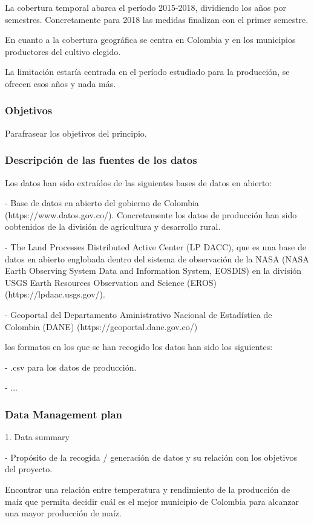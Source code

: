 \documentclass[12pt, spanish]{article}
\begin{document}
La cobertura temporal abarca el período 2015-2018, dividiendo los años por   semestres. Concretamente para 2018 las medidas finalizan con el primer semestre.

En cuanto a la cobertura geográfica se centra en Colombia y en los municipios productores del cultivo elegido.

La limitación estaría centrada en el período estudiado para la producción, se ofrecen esos años y nada más.

\subsubsection{Objetivos}

Parafrasear los objetivos del principio.

\subsubsection{Descripción de las fuentes de los datos}

Los datos han sido extraídos de las siguientes bases de datos en abierto: 

- Base de datos en abierto del gobierno de Colombia (https://www.datos.gov.co/). Concretamente los datos de producción han sido oobtenidos de la división de agricultura y desarrollo rural.

- The Land Processes Distributed Active Center (LP DACC), que es una base de datos en abierto englobada dentro del sistema de observación de la NASA (NASA Earth Observing System Data and Information System, EOSDIS) en la división USGS Earth Resources Observation and Science (EROS) (https://lpdaac.usgs.gov/).

- Geoportal del Departamento Aministrativo Nacional de Estadística de Colombia (DANE) (https://geoportal.dane.gov.co/)

los formatos en los que se han recogido los datos han sido los siguientes:

- .csv para los datos de producción.

- ...

\subsubsection{Data Management plan}

1. Data summary

- Propósito de la recogida / generación de datos y su relación con los objetivos del proyecto.

Encontrar una relación entre temperatura y rendimiento de la producción de maíz que permita decidir cuál es el mejor municipio de Colombia para alcanzar una mayor producción de maíz.
\end{document}
